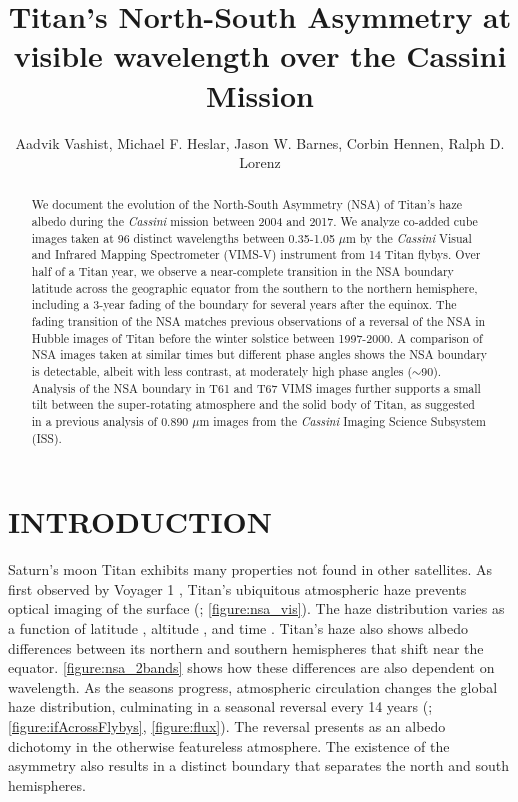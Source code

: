 \documentclass[apj,tighten]{emulateapj}
\begin{document}
\title{Titan's North-South Asymmetry at visible wavelength over the Cassini Mission}

\author{Aadvik Vashist, Michael F. Heslar, Jason W. Barnes, Corbin Hennen,
Ralph D. Lorenz}

\begin{abstract}
We document the evolution of the North-South Asymmetry (NSA) of Titan's haze albedo during the \textit{Cassini} mission between 2004 and 2017.
We analyze co-added cube images taken at 96 distinct wavelengths between 0.35-1.05 $\mu$m by the \textit{Cassini} Visual and Infrared Mapping Spectrometer (VIMS-V) instrument from 14 Titan flybys.
Over half of a Titan year, we observe a near-complete transition in the NSA boundary latitude across the geographic equator from the southern to the northern hemisphere, including a 3-year fading of the boundary for several years after the equinox.
The fading transition of the NSA matches previous observations of a reversal of the NSA in Hubble images of Titan before the winter solstice between 1997-2000. A comparison of NSA images taken at similar times but different phase angles shows the NSA boundary is detectable, albeit with less contrast, at moderately high phase angles ($\sim$90\degree). Analysis of the NSA boundary in T61 and T67 VIMS images further supports a small tilt between the super-rotating atmosphere and the solid body of Titan, as  suggested in a previous analysis of 0.890 $\mu$m images from the \textit{Cassini} Imaging Science Subsystem (ISS). 
\end{abstract}

\section{INTRODUCTION}

Saturn's moon Titan exhibits many properties not found in other satellites. As first observed by Voyager 1 \citep{smith1981encounter}, Titan's ubiquitous atmospheric haze prevents optical imaging of the surface (\cite{richardson2004113}; \autoref{figure:nsa_vis}).
The haze distribution varies as a function of latitude \citep{Sromovsky1981}, altitude \citep{smith1982new,tomasko2005rain}, and time \citep{lorenz1997titan,west2011evolution}. 
Titan's haze also shows albedo differences between its northern and southern hemispheres that shift near the equator.
\autoref{figure:nsa_2bands} shows how these differences are also dependent on wavelength.
As the seasons progress, atmospheric circulation changes the global haze distribution, culminating in a seasonal reversal every 14 years (\cite{brown2009titan};\autoref{figure:ifAcrossFlybys}, \autoref{figure:flux}).
The reversal presents as an albedo dichotomy in the otherwise featureless atmosphere.
The existence of the asymmetry also results in a  distinct boundary that separates the north and south hemispheres.
\end{document}
